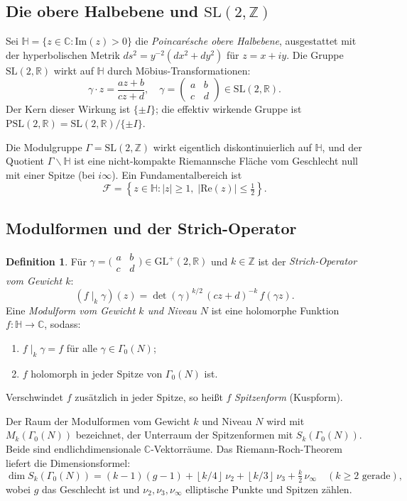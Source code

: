 \documentclass[12pt,a4paper]{amsart}
\theoremstyle{definition}
\newtheorem{definition}[theorem]{Definition}
\newcommand{\HH}{\mathbb{H}}
\newcommand{\ZZ}{\mathbb{Z}}
\newcommand{\RR}{\mathbb{R}}
\newcommand{\CC}{\mathbb{C}}
\newcommand{\GL}{\mathrm{GL}}
\newcommand{\SL}{\mathrm{SL}}
\newcommand{\PSL}{\mathrm{PSL}}
\newcommand{\im}{\mathrm{Im}}
\newcommand{\re}{\mathrm{Re}}
\newcommand{\abs}[1]{\left|#1\right|}
\newcommand{\floor}[1]{\left\lfloor #1 \right\rfloor}
\begin{document}
\subsection{Die obere Halbebene und \texorpdfstring{$\SL(2,\ZZ)$}{SL(2,Z)}}

Sei $\HH = \{z \in \CC : \im(z) > 0\}$ die \emph{Poincarésche obere Halbebene},
ausgestattet mit der hyperbolischen Metrik $ds^2 = y^{-2}(dx^2 + dy^2)$ für
$z = x+iy$. Die Gruppe $\SL(2,\RR)$ wirkt auf $\HH$ durch Möbius-Transformationen:
\[
\gamma \cdot z = \frac{az + b}{cz + d}, \quad \gamma = \begin{pmatrix}a&b\\c&d\end{pmatrix}
\in \SL(2,\RR).
\]
Der Kern dieser Wirkung ist $\{\pm I\}$; die effektiv wirkende Gruppe ist
$\PSL(2,\RR) = \SL(2,\RR)/\{\pm I\}$.

Die Modulgruppe $\Gamma = \SL(2,\ZZ)$ wirkt eigentlich diskontinuierlich auf $\HH$,
und der Quotient $\Gamma \backslash \HH$ ist eine nicht-kompakte Riemannsche Fläche
vom Geschlecht null mit einer Spitze (bei $i\infty$). Ein Fundamentalbereich ist
\[
\mathcal{F} = \left\{ z \in \HH : \abs{z} \geq 1,\; \abs{\re(z)} \leq \tfrac{1}{2} \right\}.
\]

\subsection{Modulformen und der Strich-Operator}

\begin{definition}
Für $\gamma = \bigl(\begin{smallmatrix}a&b\\c&d\end{smallmatrix}\bigr) \in \GL^+(2,\RR)$
und $k \in \ZZ$ ist der \emph{Strich-Operator vom Gewicht $k$}:
\[
(f \mid_k \gamma)(z) = \det(\gamma)^{k/2}\, (cz+d)^{-k}\, f(\gamma z).
\]
Eine \emph{Modulform vom Gewicht $k$ und Niveau $N$} ist eine holomorphe Funktion
$f : \HH \to \CC$, sodass:
\begin{enumerate}[label=(\roman*)]
\item $f \mid_k \gamma = f$ für alle $\gamma \in \Gamma_0(N)$;
\item $f$ holomorph in jeder Spitze von $\Gamma_0(N)$ ist.
\end{enumerate}
Verschwindet $f$ zusätzlich in jeder Spitze, so heißt $f$ \emph{Spitzenform} (Kuspform).
\end{definition}

Der Raum der Modulformen vom Gewicht $k$ und Niveau $N$ wird mit $M_k(\Gamma_0(N))$
bezeichnet, der Unterraum der Spitzenformen mit $S_k(\Gamma_0(N))$. Beide sind
endlichdimensionale $\CC$-Vektorräume. Das Riemann-Roch-Theorem liefert die Dimensionsformel:
\[
\dim S_k(\Gamma_0(N)) = (k-1)(g-1) + \floor{k/4}\,\nu_2 + \floor{k/3}\,\nu_3 + \tfrac{k}{2}\,\nu_\infty
\quad (k \geq 2 \text{ gerade}),
\]
wobei $g$ das Geschlecht ist und $\nu_2, \nu_3, \nu_\infty$ elliptische Punkte
und Spitzen zählen.
\end{document}
